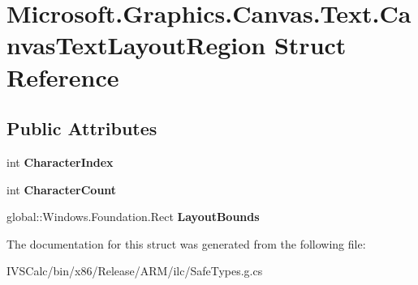 \hypertarget{struct_microsoft_1_1_graphics_1_1_canvas_1_1_text_1_1_canvas_text_layout_region}{}\section{Microsoft.\+Graphics.\+Canvas.\+Text.\+Canvas\+Text\+Layout\+Region Struct Reference}
\label{struct_microsoft_1_1_graphics_1_1_canvas_1_1_text_1_1_canvas_text_layout_region}
\subsection*{Public Attributes}
\begin{DoxyCompactItemize}
\item 
\mbox{\label{struct_microsoft_1_1_graphics_1_1_canvas_1_1_text_1_1_canvas_text_layout_region_a372b5d460fa1c3d8b11cbb764349809f}} 
int {\bfseries Character\+Index}
\item 
\mbox{\label{struct_microsoft_1_1_graphics_1_1_canvas_1_1_text_1_1_canvas_text_layout_region_a1c8e71aa6c1ed9a05076de7590950474}} 
int {\bfseries Character\+Count}
\item 
\mbox{\label{struct_microsoft_1_1_graphics_1_1_canvas_1_1_text_1_1_canvas_text_layout_region_aace5ad89b539a9bcdd39af80217b5e5a}} 
global\+::\+Windows.\+Foundation.\+Rect {\bfseries Layout\+Bounds}
\end{DoxyCompactItemize}


The documentation for this struct was generated from the following file\+:\begin{DoxyCompactItemize}
\item 
I\+V\+S\+Calc/bin/x86/\+Release/\+A\+R\+M/ilc/Safe\+Types.\+g.\+cs\end{DoxyCompactItemize}
